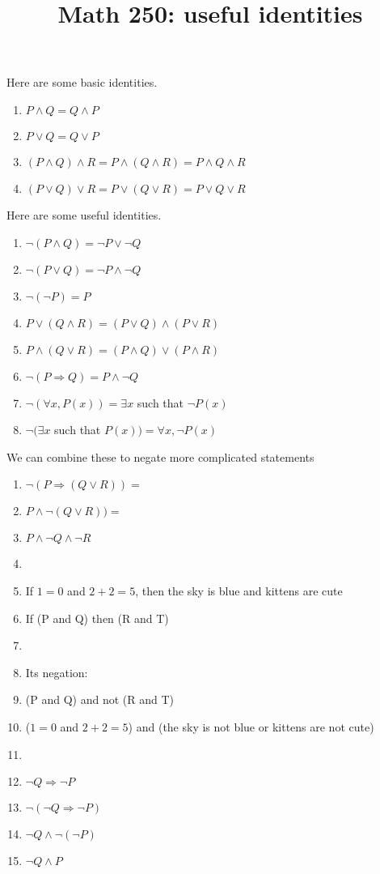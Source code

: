 \documentclass[12pt, reqno]{amsart}
\begin{document}
\title[Math 250: useful  identities]{Math 250: useful identities}\maketitle

Here are some basic identities.
\begin{enumerate}
\item $P \wedge Q = Q \wedge P$
\item $P \vee Q = Q \vee P$
\item $(P \wedge Q) \wedge R = P \wedge (Q \wedge R) = P \wedge Q \wedge R$
\item $(P \vee Q) \vee R = P \vee (Q \vee R) = P \vee Q \vee R$  
\end{enumerate}


Here are some useful identities.

\begin{enumerate}
\item $\neg(P \wedge Q) = \neg P \vee \neg Q$
\item $\neg(P \vee Q) = \neg P \wedge \neg Q$
\item $\neg(\neg P) = P$
\item $P \vee (Q \wedge R) = (P \vee Q) \wedge (P \vee R)$
\item $P \wedge (Q \vee R) = (P \wedge Q) \vee (P \wedge R)$
\item $\neg (P \Rightarrow Q) = P \wedge \neg Q$
\item $\neg (\forall x, P(x)) = \exists x$  such that $\neg P(x)$
\item $\neg (\exists x$ such that $P(x)) = \forall x, \neg P(x)$

\end{enumerate}
\vspace{10pt}

We can combine these to negate more complicated statements

\begin{enumerate}
\item $\neg(P \Rightarrow (Q \vee R)) = $ 
\item [] $P \wedge \neg (Q \vee R)) = $ 
\item [] $P \wedge \neg Q \wedge \neg R$ 
\item []
\item If $1 = 0$ and $2 + 2 = 5$, then the sky is blue and kittens are cute
\item [] If (P and Q) then (R and T)
\item [] 
\item [] Its negation:
\item [] (P and Q) and not (R and T)
\item [] ($1 = 0$ and $2 + 2  = 5$) and (the sky is not blue or kittens are not cute)
\item []
\item $\neg Q \Rightarrow \neg P$
\item [] $\neg (\neg Q \Rightarrow \neg P)$
\item [] $\neg Q \wedge \neg(\neg P)$
\item [] $\neg Q \wedge P$
\end{enumerate}
\end{document}
